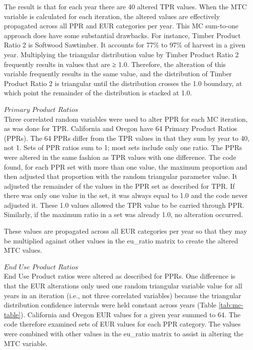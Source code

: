 \documentclass[
]{book}
\begin{document}
The result is that for each year there are 40 altered TPR values. When the MTC variable is calculated for each iteration, the altered values are effectively propagated across all PPR and EUR categories per year. This MC sum-to-one approach does have some substantial drawbacks. For instance, Timber Product Ratio 2 is Softwood Sawtimber. It accounts for 77\% to 97\% of harvest in a given year. Multiplying the triangular distribution value by Timber Product Ratio 2 frequently results in values that are ≥ 1.0. Therefore, the alteration of this variable frequently results in the same value, and the distribution of Timber Product Ratio 2 is triangular until the distribution crosses the 1.0 boundary, at which point the remainder of the distribution is stacked at 1.0.

\(\textit{Primary Product Ratios}\)\\
Three correlated random variables were used to alter PPR for each MC iteration, as was done for TPR. California and Oregon have 64 Primary Product Ratios (PPRs). The 64 PPRs differ from the TPR values in that they sum by year to 40, not 1. Sets of PPR ratios sum to 1; most sets include only one ratio. The PPRs were altered in the same fashion as TPR values with one difference. The code found, for each PPR set with more than one value, the maximum proportion and then adjusted that proportion with the random triangular parameter value. It adjusted the remainder of the values in the PPR set as described for TPR. If there was only one value in the set, it was always equal to 1.0 and the code never adjusted it. These 1.0 values allowed the TPR value to be carried through PPR. Similarly, if the maximum ratio in a set was already 1.0, no alteration occurred.

These values are propagated across all EUR categories per year so that they may be multiplied against other values in the eu\_ratio matrix to create the altered MTC values.

\(\textit{End Use Product Ratios}\)\\
End Use Product ratios were altered as described for PPRs. One difference is that the EUR alterations only used one random triangular variable value for all years in an iteration (i.e., not three correlated variables) because the triangular distribution confidence intervals were held constant across years (Table \ref{tab:mc-table}). California and Oregon EUR values for a given year summed to 64. The code therefore examined sets of EUR values for each PPR category. The values were combined with other values in the eu\_ratio matrix to assist in altering the MTC variable.
\end{document}
